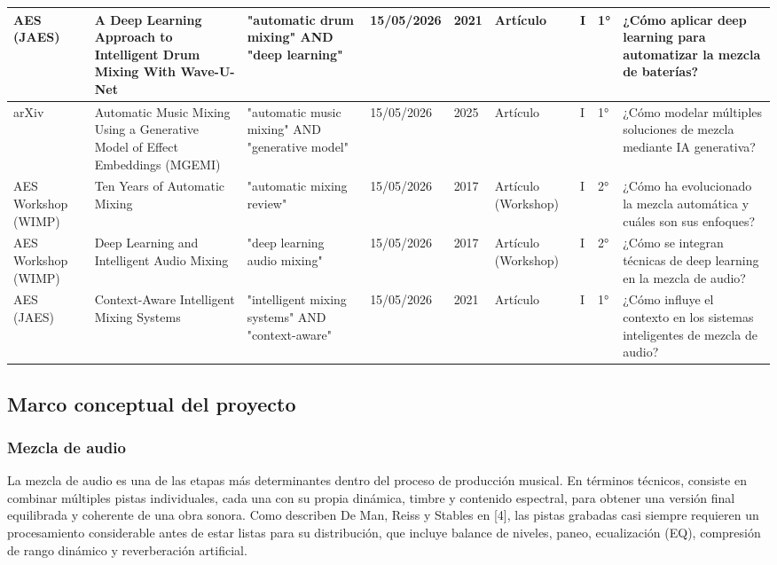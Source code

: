 \documentclass[12pt]{article}
\begin{document}
\begin{longtable}{|p{1.4cm}|p{3.0cm}|p{2.2cm}|p{1.5cm}|p{1.0cm}|p{1.6cm}|p{0.9cm}|p{1.3cm}|p{2.6cm}|}
\hline
AES (JAES) & A Deep Learning Approach to Intelligent Drum Mixing With Wave-U-Net & "automatic drum mixing" AND "deep learning" & 15/05/2026 & 2021 & Artículo & I & 1° & ¿Cómo aplicar deep learning para automatizar la mezcla de baterías? \\
\hline
arXiv & Automatic Music Mixing Using a Generative Model of Effect Embeddings (MGEMI) & "automatic music mixing" AND "generative model" & 15/05/2026 & 2025 & Artículo & I & 1° & ¿Cómo modelar múltiples soluciones de mezcla mediante IA generativa? \\
\hline
AES Workshop (WIMP) & Ten Years of Automatic Mixing & "automatic mixing review" & 15/05/2026 & 2017 & Artículo (Workshop) & I & 2° & ¿Cómo ha evolucionado la mezcla automática y cuáles son sus enfoques? \\
\hline
AES Workshop (WIMP) & Deep Learning and Intelligent Audio Mixing & "deep learning audio mixing" & 15/05/2026 & 2017 & Artículo (Workshop) & I & 2° & ¿Cómo se integran técnicas de deep learning en la mezcla de audio? \\
\hline
AES (JAES) & Context-Aware Intelligent Mixing Systems & "intelligent mixing systems" AND "context-aware" & 15/05/2026 & 2021 & Artículo & I & 1° & ¿Cómo influye el contexto en los sistemas inteligentes de mezcla de audio? \\
\hline
\end{longtable}

\subsection*{Marco conceptual del proyecto}

\subsubsection*{Mezcla de audio}

La mezcla de audio es una de las etapas más determinantes dentro del proceso de producción musical. En términos técnicos, consiste en combinar múltiples pistas individuales, cada una con su propia dinámica, timbre y contenido espectral, para obtener una versión final equilibrada y coherente de una obra sonora. Como describen De Man, Reiss y Stables en [4], las pistas grabadas casi siempre requieren un procesamiento considerable antes de estar listas para su distribución, que incluye balance de niveles, paneo, ecualización (EQ), compresión de rango dinámico y reverberación artificial.
\end{document}
